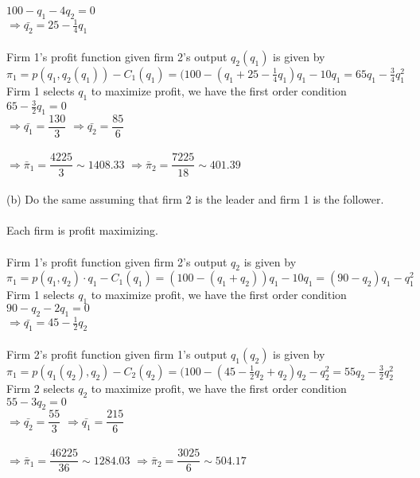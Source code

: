 \documentclass{article}
\begin{document}
\begin{itemize}
    $100-q_1-4q_2=0$\\
    $\Rightarrow \bar{q_2}=25-\frac{1}{4}q_1$\\\\
    Firm 1's profit function given firm 2's output $q_2(q_1)$ is given by\\
    $\pi_1=p(q_1,q_2(q_1))-C_1(q_1)=(100-(q_1+25-\frac{1}{4}q_1)q_1-10q_1=65q_1-\frac{3}{4}q_1^2$\\
    Firm 1 selects $q_1$ to maximize profit, we have the first order condition\\
    $65-\frac{3}{2}q_1=0$\\
    $\Rightarrow \bar{q_1}=\dfrac{130}{3}$ $\Rightarrow \bar{q_2}=\dfrac{85}{6}$\\\\
    $\Rightarrow \bar{\pi}_1=\dfrac{4225}{3}\sim1408.33$ $\Rightarrow \bar{\pi}_2=\dfrac{7225}{18}\sim401.39$\\\\
    (b) Do the same assuming that firm 2 is the leader and firm 1 is the follower.\\\\
    Each firm is profit maximizing.\\\\
    Firm 1's profit function given firm 2's output $q_2$ is given by\\
    $\pi_1=p(q_1,q_2)\cdot q_1-C_1(q_1)=(100-(q_1+q_2))q_1-10q_1=(90-q_2)q_1-q_1^2$\\
    Firm 1 selects $q_1$ to maximize profit, we have the first order condition\\
    $90-q_2-2q_1=0$\\
    $\Rightarrow \bar{q_1}=45-\frac{1}{2}q_2$\\\\
    Firm 2's profit function given firm 1's output $q_1(q_2)$ is given by\\
    $\pi_1=p(q_1(q_2),q_2)-C_2(q_2)=(100-(45-\frac{1}{2}q_2+q_2)q_2-q_2^2=55q_2-\frac{3}{2}q_2^2$\\
    Firm 2 selects $q_2$ to maximize profit, we have the first order condition\\
    $55-3q_2=0$\\
    $\Rightarrow \bar{q_2}=\dfrac{55}{3}$ $\Rightarrow \bar{q_1}=\dfrac{215}{6}$\\\\
    $\Rightarrow \bar{\pi}_1=\dfrac{46225}{36}\sim1284.03$ $\Rightarrow \bar{\pi}_2=\dfrac{3025}{6}\sim504.17$\\\\

\end{itemize}
\end{document}
